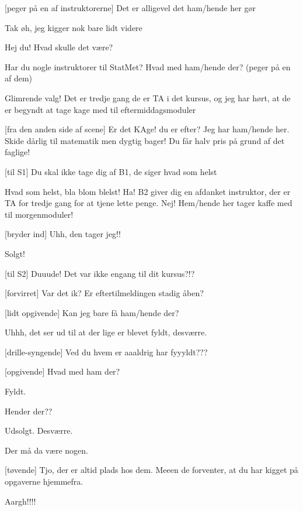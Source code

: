 \documentclass[a4paper,11pt]{article}
\begin{document}
\begin{sketch}
[peger på en af instruktorerne] Det er alligevel det ham/hende her gør

 Tak øh, jeg kigger nok bare lidt videre


 Hej du! Hvad skulle det være?

 Har du nogle instruktorer til StatMet? Hvad med ham/hende der? (peger på en af dem)

 Glimrende valg! Det er tredje gang de er TA i det kursus, og jeg har hørt, at de er begyndt at tage kage med til eftermiddagsmoduler 

[fra den anden side af scene] Er det KAge! du er efter? Jeg har ham/hende her. Skide dårlig til matematik men dygtig bager! Du får halv pris på grund af det faglige! 

[til S1] Du skal ikke tage dig af B1, de siger hvad som helst

 Hvad som helst, bla blom blelst! Ha! B2 giver dig en afdanket instruktor, der er TA for tredje gang for at tjene lette penge. Nej! Hem/hende her tager kaffe med til morgenmoduler!

[bryder ind] Uhh, den tager jeg!!

 Solgt!

[til S2] Duuude! Det var ikke engang til dit kursus?!?

[forvirret] Var det ik? Er eftertilmeldingen stadig åben?


[lidt opgivende] Kan jeg bare få ham/hende der?

 Uhhh, det ser ud til at der lige er blevet fyldt, desværre. 

[drille-syngende] Ved du hvem er aaaldrig har fyyyldt???


[opgivende] Hvad med ham der?

 Fyldt.

 Hender der??

 Udsolgt. Desværre.

 Der må da være nogen.

[tøvende] Tjo, der er altid plads hos dem. Meeen de forventer, at du har kigget på opgaverne hjemmefra.

 Aargh!!!!


\end{sketch}
\end{document}
